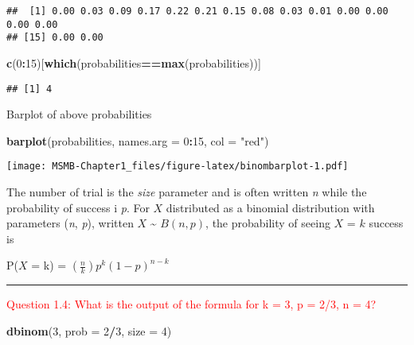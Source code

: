 \documentclass[]{article}
\newenvironment{Shaded}{\begin{snugshade}}{\end{snugshade}}
\newcommand{\KeywordTok}[1]{\textcolor[rgb]{0.13,0.29,0.53}{\textbf{#1}}}
\newcommand{\DataTypeTok}[1]{\textcolor[rgb]{0.13,0.29,0.53}{#1}}
\newcommand{\DecValTok}[1]{\textcolor[rgb]{0.00,0.00,0.81}{#1}}
\newcommand{\StringTok}[1]{\textcolor[rgb]{0.31,0.60,0.02}{#1}}
\newcommand{\OperatorTok}[1]{\textcolor[rgb]{0.81,0.36,0.00}{\textbf{#1}}}
\newcommand{\NormalTok}[1]{#1}
\let\origfigure\figure
\let\endorigfigure\endfigure
\renewenvironment{figure}[1][2] {
    \expandafter\origfigure\expandafter[H]
} {
    \endorigfigure
}
\let\oldrule=\rule
\renewcommand{\rule}[1]{\oldrule{\linewidth}}
\begin{document}
\begin{verbatim}
##  [1] 0.00 0.03 0.09 0.17 0.22 0.21 0.15 0.08 0.03 0.01 0.00 0.00 0.00 0.00
## [15] 0.00 0.00
\end{verbatim}

\begin{Shaded}
\begin{Highlighting}[]
\KeywordTok{c}\NormalTok{(}\DecValTok{0}\OperatorTok{:}\DecValTok{15}\NormalTok{)[}\KeywordTok{which}\NormalTok{(probabilities}\OperatorTok{==}\KeywordTok{max}\NormalTok{(probabilities))]}
\end{Highlighting}
\end{Shaded}

\begin{verbatim}
## [1] 4
\end{verbatim}

Barplot of above probabilities

\begin{Shaded}
\begin{Highlighting}[]
\KeywordTok{barplot}\NormalTok{(probabilities, }\DataTypeTok{names.arg =} \DecValTok{0}\OperatorTok{:}\DecValTok{15}\NormalTok{, }\DataTypeTok{col =} \StringTok{"red"}\NormalTok{)}
\end{Highlighting}
\end{Shaded}

\begin{figure}
\centering
\texttt{[image: MSMB-Chapter1\_files/figure-latex/binombarplot-1.pdf]}
\caption{Theoretical distribution of \(B(15,0.3)\) . The highest bar is
at \(x = 4\). We have chosen to represent theoretical values in red
throughout.}
\end{figure}

The number of trial is the \emph{size} parameter and is often written
\emph{n} while the probability of success i \emph{p}. For \(X\)
distributed as a binomial distribution with parameters (\emph{n},
\emph{p}), written \(X\) \textasciitilde{} \(B(n,p)\), the probability
of seeing \(X\) = \(k\) success is

P(\(X\) = k) = \((\frac{n}{k})p^k(1-p)^{n-k}\)

\begin{center}\rule{0.5\linewidth}{\linethickness}\end{center}

\textcolor{red}{Question 1.4: What is the output of the formula for k = 3, p = 2/3, n = 4?}

\begin{Shaded}
\begin{Highlighting}[]
\KeywordTok{dbinom}\NormalTok{(}\DecValTok{3}\NormalTok{, }\DataTypeTok{prob =} \DecValTok{2}\OperatorTok{/}\DecValTok{3}\NormalTok{, }\DataTypeTok{size =} \DecValTok{4}\NormalTok{)}
\end{Highlighting}
\end{Shaded}
\end{document}
